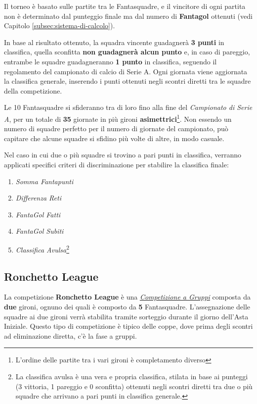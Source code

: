 \documentclass[12pt]{article}
\begin{document}
Il torneo è basato sulle partite tra le Fantasquadre, e il vincitore di ogni partita non è determinato dal punteggio finale ma dal numero di \textbf{Fantagol} ottenuti (vedi Capitolo \ref{subsec:sistema-di-calcolo}).

In base al risultato ottenuto, la squadra vincente guadagnerà \textbf{3 punti} in classifica, quella sconfitta \textbf{non guadagnerà alcun punto} e, in caso di pareggio, entrambe le squadre guadagneranno \textbf{1 punto} in classifica, seguendo il regolamento del campionato di calcio di Serie A. Ogni giornata viene aggiornata la classifica generale, inserendo i punti ottenuti negli scontri diretti tra le squadre della competizione.

Le 10 Fantasquadre si sfideranno tra di loro fino alla fine del \textit{Campionato di Serie A}, per un totale di \textbf{35} giornate in più gironi \textbf{asimettrici}\footnote{L’ordine delle partite tra i vari gironi è completamento diverso}. 
Non essendo un numero di squadre perfetto per il numero di giornate del campionato, può capitare che alcune squadre si sfidino più volte di altre, in modo casuale.

Nel caso in cui due o più squadre si trovino a pari punti in classifica, verranno applicati specifici criteri di discriminazione per stabilire la classifica finale:

\begin{enumerate}
    \item \textit{Somma Fantapunti}
    \item \textit{Differenza Reti}
    \item \textit{FantaGol Fatti}
    \item \textit{FantaGol Subiti}
    \item \textit{Classifica Avulsa}\footnote{La classifica avulsa è una vera e propria classifica, stilata in base ai punteggi (3 vittoria, 1 pareggio e 0 sconfitta) ottenuti negli scontri diretti tra due o più squadre che arrivano a pari punti in classifica generale.}
\end{enumerate}
\subsection{Ronchetto League}
La competizione \textbf{Ronchetto League} è una \textit{\hyperref[competizione-a-gruppi]{Competizione a Gruppi}} composta da \textbf{due} gironi, ognuno dei quali è composto da \textbf{5} Fantasquadre. L'assegnazione delle squadre ai due gironi verrà stabilita tramite sorteggio durante il giorno dell'Asta Iniziale. Questo tipo di competizione è tipico delle coppe, dove prima degli scontri ad eliminazione diretta, c'è la fase a gruppi.
\end{document}
